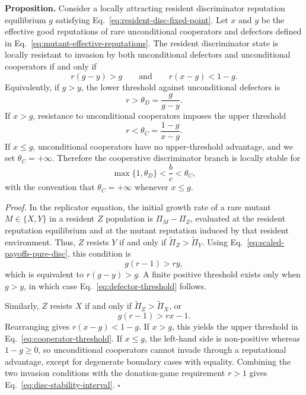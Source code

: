 \documentclass[fleqn,10pt]{wlscirep}
\begin{document}
\textbf{Proposition.}
Consider a locally attracting resident discriminator reputation equilibrium $g$ satisfying Eq.~\eqref{eq:resident-disc-fixed-point}. Let $x$ and $y$ be the effective good reputations of rare unconditional cooperators and defectors defined in Eq.~\eqref{eq:mutant-effective-reputations}. The resident discriminator state is locally resistant to invasion by both unconditional defectors and unconditional cooperators if and only if
\begin{equation}
\label{eq:disc-stability-inequalities}
r(g-y)>g
\qquad\text{and}\qquad
r(x-g)<1-g.
\end{equation}
Equivalently, if $g>y$, the lower threshold against unconditional defectors is
\begin{equation}
\label{eq:defector-threshold}
r>\theta_D=\frac{g}{g-y}.
\end{equation}
If $x>g$, resistance to unconditional cooperators imposes the upper threshold
\begin{equation}
\label{eq:cooperator-threshold}
r<\theta_C=\frac{1-g}{x-g}.
\end{equation}
If $x\le g$, unconditional cooperators have no upper-threshold advantage, and we set $\theta_C=+\infty$. Therefore the cooperative discriminator branch is locally stable for
\begin{equation}
\label{eq:disc-stability-interval}
\max\{1,\theta_D\}<\frac{b}{c}<\theta_C,
\end{equation}
with the convention that $\theta_C=+\infty$ whenever $x\le g$.

\textit{Proof.}
In the replicator equation, the initial growth rate of a rare mutant $M\in\{X,Y\}$ in a resident $Z$ population is $\Pi_M-\Pi_Z$, evaluated at the resident reputation equilibrium and at the mutant reputation induced by that resident environment. Thus, $Z$ resists $Y$ if and only if $\widetilde\Pi_Z>\widetilde\Pi_Y$. Using Eq.~\eqref{eq:scaled-payoffs-pure-disc}, this condition is
\[
g(r-1)>ry,
\]
which is equivalent to $r(g-y)>g$. A finite positive threshold exists only when $g>y$, in which case Eq.~\eqref{eq:defector-threshold} follows.

Similarly, $Z$ resists $X$ if and only if $\widetilde\Pi_Z>\widetilde\Pi_X$, or
\[
g(r-1)>rx-1.
\]
Rearranging gives $r(x-g)<1-g$. If $x>g$, this yields the upper threshold in Eq.~\eqref{eq:cooperator-threshold}. If $x\le g$, the left-hand side is non-positive whereas $1-g\ge 0$, so unconditional cooperators cannot invade through a reputational advantage, except for degenerate boundary cases with equality. Combining the two invasion conditions with the donation-game requirement $r>1$ gives Eq.~\eqref{eq:disc-stability-interval}. \hfill$\square$
\end{document}
